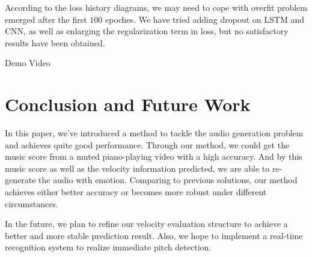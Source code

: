 \documentclass[10pt,twocolumn,letterpaper]{article}
\begin{document}
According to the loss history diagrams, we may need to cope with overfit problem emerged after the first \(100\) epoches. We have tried adding dropout on LSTM and CNN, as well as enlarging the regularization term in loss, but no satisfactory results have been obtained.

Demo Video

\section{Conclusion and Future Work}

In this paper, we've introduced a method to tackle the audio generation problem and achieves quite good performance.
Through our method, we could get the music score from a muted piano-playing video with a high accuracy.
And by this music score as well as the velocity information predicted, we are able to re-generate the audio with emotion.
Comparing to previous solutions, our method achieves either better accuracy or becomes more robust under different circumstances.

In the future, we plan to refine our velocity evaluation structure to achieve a better and more stable prediction result.
Also, we hope to implement a real-time recognition system to realize immediate pitch detection.


{\small


}
\end{document}
